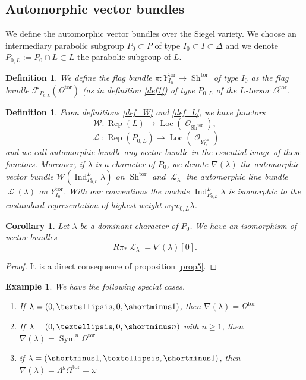\documentclass[11pt]{amsart}
\numberwithin{subsection}{section}
\numberwithin{figure}{section}
\numberwithin{table}{section}
\theoremstyle{1}
\newtheorem{corollary}[theorem]{Corollary}
\newtheorem{definition}[theorem]{Definition}
\theoremstyle{2}
\newtheorem{example}[theorem]{Example}
\DeclareMathOperator{\Rep}{Rep}
\DeclareMathOperator{\Ind}{Ind}
\DeclareMathOperator{\Sh}{Sh}
\DeclareMathOperator{\Sym}{Sym}
\DeclareMathOperator{\tor}{tor}
\DeclareMathOperator{\Lc}{\mathcal{L}}
\DeclareMathOperator{\Oc}{\mathcal{O}}
\DeclareMathOperator{\Loc}{Loc}
\begin{document}
\subsection{Automorphic vector bundles}
We define the automorphic vector bundles over the Siegel variety. We choose an intermediary parabolic subgroup $P_0 \subset P$ of type $I_0 \subset I \subset \Delta$ and we denote $P_{0,L} := P_0 \cap L \subset L$ the parabolic subgroup of $L$. 
\begin{definition}
We define the flag bundle $\pi : Y^{\tor}_{I_0} \rightarrow \Sh^{\tor}$ of type $I_0$ as the flag bundle $\mathcal{F}_{P_{0,L}}(\Omega^{\tor})$ (as in definition \ref{def1}) of type $P_{0,L}$ of the $L$-torsor $\Omega^{\tor}$.
\end{definition}
\begin{definition}
From definitions \ref{def_W} and \ref{def_L}, we have functors 
\begin{equation*}
\mathcal{W} : \Rep(L) \rightarrow \Loc(\Oc_{\Sh^{\tor}}),
\end{equation*}
\begin{equation*}
\Lc : \Rep(P_{0,L}) \rightarrow \Loc(\Oc_{Y_{I_0}^{\tor}})
\end{equation*}
and we call automorphic bundle any vector bundle in the essential image of these functors. Moreover, if $\lambda$ is a character of $P_0$, we denote $\nabla(\lambda)$ the automorphic vector bundle $\mathcal{W}(\Ind_{P_{0,L}}^L \lambda)$ on $\Sh^{\tor}$ and $\Lc_{\lambda}$ the automorphic line bundle $\Lc(\lambda)$ on $Y_{I_0}^{\tor}$. With our conventions the module $\Ind_{P_{0,L}}^L \lambda$ is isomorphic to the costandard representation of highest weight $w_0w_{0,L}\lambda$.
\end{definition}
\begin{corollary}\label{prop13_sieg}
Let $\lambda$ be a dominant character of $P_0$. We have an isomorphism of vector bundles
\begin{equation*}
R\pi_* \Lc_{\lambda} = \nabla(\lambda)[0].
\end{equation*}
\end{corollary}
\begin{proof}
It is a direct consequence of proposition \ref{prop5}.
\end{proof}
\begin{example}
We have the following special cases.
\begin{enumerate}
\item If $\lambda = (0, \ldots, 0, \shortminus 1)$, then $\nabla(\lambda) = \Omega^{\tor}$
\item If $\lambda = (0, \ldots, 0, \shortminus n)$ with $n \geq 1$, then $\nabla(\lambda) = \Sym^n \Omega^{\tor}$
\item if $\lambda = (\shortminus 1, \ldots, \shortminus 1)$, then $\nabla(\lambda) = \Lambda^g\Omega^{\tor} = \omega$
\end{enumerate}
\end{example}
\end{document}
